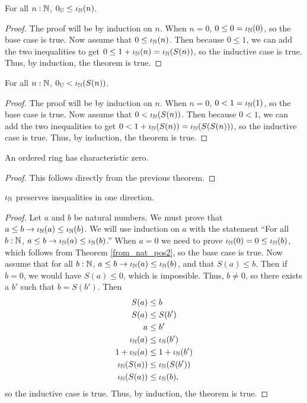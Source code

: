 \documentclass[../../math.tex]{subfiles}
\begin{document}
\begin{theorem} \label{from_nat_pos2}
    For all $n : \mathbb{N}$, $0_{\mathbb{U}} \leq \iota_{\mathbb{N}}(n)$.
\end{theorem}
\begin{proof}
    The proof will be by induction on $n$.  When $n = 0$, $0 \leq 0 = \iota_{\mathbb{N}}(0)$,
    so the base case is true.  Now assume that $0 \leq \iota_{\mathbb{N}}(n)$.  Then because $0
    \leq 1$, we can add the two inequalities to get $0 \leq 1 + \iota_{\mathbb{N}}(n) =
    \iota_{\mathbb{N}}(S(n))$, so the inductive case is true.  Thus, by induction, the theorem
    is true.
\end{proof}

\begin{theorem} \label{from_nat_pos}
    For all $n : \mathbb{N}$, $0_{\mathbb{U}} < \iota_{\mathbb{N}}(S(n))$.
\end{theorem}
\begin{proof}
    The proof will be by induction on $n$.  When $n = 0$, $0 < 1 = \iota_{\mathbb{N}}(1)$, so
    the base case is true.  Now assume that $0 < \iota_{\mathbb{N}}(S(n))$.  Then because $0 <
    1$, we can add the two inequalities to get $0 < 1 + \iota_{\mathbb{N}}(S(n)) =
    \iota_{\mathbb{N}}(S(S(n)))$, so the inductive case is true.  Thus, by induction, the
    theorem is true.
\end{proof}

\begin{instance}
    An ordered ring has characteristic zero.
\end{instance}
\begin{proof}
    This follows directly from the previous theorem.
\end{proof}

\begin{instance}
    $\iota_{\mathbb{N}}$ preserves inequalities in one direction.
\end{instance}
\begin{proof}
    Let $a$ and $b$ be natural numbers.  We must prove that $a \leq b
    \rightarrow \iota_{\mathbb{N}}(a) \leq \iota_{\mathbb{N}}(b)$.  We will use induction on $a$ with the
    statement ``For all $b : \mathbb{N}$, $a \leq b \rightarrow \iota_{\mathbb{N}}(a) \leq \iota_{\mathbb{N}}(b)$.''
    When $a = 0$ we need to prove $\iota_{\mathbb{N}}(0) = 0 \leq \iota_{\mathbb{N}}(b)$, which follows from
    Theorem \ref{from_nat_pos2}, so the base case is true.  Now assume that for
    all $b : \mathbb{N}$, $a \leq b \rightarrow \iota_{\mathbb{N}}(a) \leq \iota_{\mathbb{N}}(b)$, and that $S(a) \leq
    b$.  Then if $b = 0$, we would have $S(a) \leq 0$, which is impossible.
    Thus, $b \neq 0$, so there exists a $b'$ such that $b = S(b')$.  Then
    \begin{align*}
        S(a) &\leq b \\
        S(a) &\leq S(b') \\
        a &\leq b' \\
        \iota_{\mathbb{N}}(a) &\leq \iota_{\mathbb{N}}(b') \\
        1 + \iota_{\mathbb{N}}(a) &\leq 1 + \iota_{\mathbb{N}}(b') \\
        \iota_{\mathbb{N}}(S(a)) &\leq \iota_{\mathbb{N}}(S(b')) \\
        \iota_{\mathbb{N}}(S(a)) &\leq \iota_{\mathbb{N}}(b),
    \end{align*}
    so the inductive case is true.  Thus, by induction, the theorem is true.
\end{proof}
\end{document}
